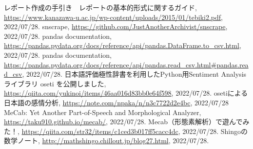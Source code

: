 \documentclass[a4paper, 11pt, titlepage]{jsarticle}
\begin{document}
\begin{thebibliography}{n}
  レポート作成の手引き　レポートの基本的形式に関するガイド, \url{https://www.kanazawa-u.ac.jp/wp-content/uploads/2015/01/tebiki2.pdf}, 2022/07/28.
      snscrape, \url{https://github.com/JustAnotherArchivist/snscrape}, 2022/07/28.
      pandas documentation, \url{https://pandas.pydata.org/docs/reference/api/pandas.DataFrame.to_csv.html}, 2022/07/28.
      pandas documentation, \url{https://pandas.pydata.org/docs/reference/api/pandas.read_csv.html#pandas.read_csv}, 2022/07/28.
      日本語評価極性辞書を利用したPython用Sentiment Analysisライブラリ oseti を公開しました, \url{https://qiita.com/yukinoi/items/46aa016d83bb0e64f598}, 2022/07/28.
      osetiによる日本語の感情分析, \url{https://note.com/npaka/n/n3c7722d2e4bc}, 2022/07/28
      MeCab: Yet Another Part-of-Speech and Morphological Analyzer, \url{https://taku910.github.io/mecab/}, 2022/07/28.
      Mecab（形態素解析）で遊んでみた！, \url{https://qiita.com/str32/items/c1ced3b017ff5cacc4dc}, 2022/07/28.
      Shingoの数学ノート, \url{http://mathshingo.chillout.jp/blog27.html}, 2022/07/28.

\end{thebibliography}
\end{document}
